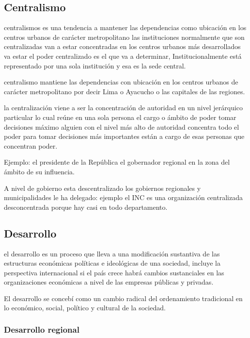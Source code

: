 \documentclass[
  letterpaper,
  DIV=11,
  numbers=noendperiod]{scrartcl}
\begin{document}
\hypertarget{centralismo}{%
\subsection{Centralismo}\label{centralismo}}

centralismos es una tendencia a mantener las dependencias como ubicación
en los centros urbanos de carácter metropolitano las instituciones
normalmente que son centralizadas van a estar concentradas en los
centros urbanos más desarrollados va estar el poder centralizado es el
que va a determinar, Institucionalmente está representado por una sola
institución y esa es la sede central.

centralismo mantiene las dependencias con ubicación en los centros
urbanos de carácter metropolitano por decir Lima o Ayacucho o las
capitales de las regiones.

la centralización viene a ser la concentración de autoridad en un nivel
jerárquico particular lo cual reúne en una sola persona el cargo o
ámbito de poder tomar decisiones máximo alguien con el nivel más alto de
autoridad concentra todo el poder para tomar decisiones más importantes
están a cargo de esas personas que concentran poder.

Ejemplo: el presidente de la República el gobernador regional en la zona
del ámbito de su influencia.

A nivel de gobierno esta descentralizado los gobiernos regionales y
municipalidades le ha delegado: ejemplo el INC es una organización
centralizada desconcentrada porque hay casi en todo departamento.

\hypertarget{desarrollo}{%
\subsection{Desarrollo}\label{desarrollo}}

el desarrollo es un proceso que lleva a una modificación sustantiva de
las estructuras económicas políticas e ideológicas de una sociedad,
incluye la perspectiva internacional si el país crece habrá cambios
sustanciales en las organizaciones económicas a nivel de las empresas
públicas y privadas.

El desarrollo se concebí como un cambio radical del ordenamiento
tradicional en lo económico, social, político y cultural de la sociedad.

\hypertarget{desarrollo-regional}{%
\subsubsection{Desarrollo regional}\label{desarrollo-regional}}
\end{document}
